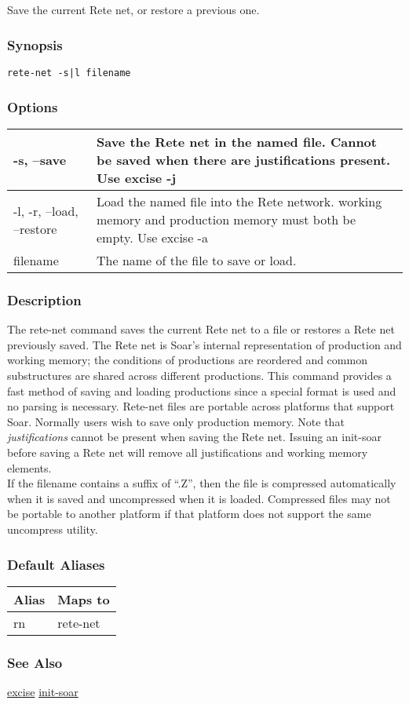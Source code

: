 \subsection{}
\label{rete-net}
Save the current Rete net, or restore a previous one. 
\subsubsection*{Synopsis}
\begin{verbatim}
rete-net -s|l filename
\end{verbatim}
\subsubsection*{Options}
\begin{tabular}{|l|l|}
\hline 
 -s, --save  & Save the Rete net in the named file. Cannot be saved when there are justifications present. Use excise -j \\
 \hline 
 -l, -r, --load, --restore  & Load the named file into the Rete network. working memory and production memory must both be empty. Use excise -a \\
 \hline 
filename & The name of the file to save or load.  \\
 \hline 
\end{tabular}
\subsubsection*{Description}
 The rete-net command saves the current Rete net to a file or restores a Rete net previously saved. The Rete net is Soar's internal representation of production and working memory; the conditions of productions are reordered and common substructures are shared across different productions. This command provides a fast method of saving and loading productions since a special format is used and no parsing is necessary. Rete-net files are portable across platforms that support Soar. 
 Normally users wish to save only production memory. Note that \emph{justifications}
 cannot be present when saving the Rete net. Issuing an init-soar before saving a Rete net will remove all justifications and working memory elements. \\ 
 If the filename contains a suffix of ``.Z'', then the file is compressed automatically when it is saved and uncompressed when it is loaded. Compressed files may not be portable to another platform if that platform does not support the same uncompress utility. 
\subsubsection*{Default Aliases}
\begin{tabular}{|l|l|}
\hline 
 Alias  & Maps to  \\
 \hline 
 rn  & rete-net  \\
 \hline 
\end{tabular}
\subsubsection*{See Also}
\hyperref[excise]{excise} \hyperref[init-soar]{init-soar} 